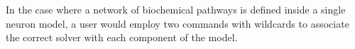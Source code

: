 \documentclass[10pt,letterpaper]{article}
\begin{document}


In the case where a network of biochemical pathways is defined inside a single neuron model, a user would employ two commands with wildcards to associate the correct solver with each component of the model.%




\end{document}
